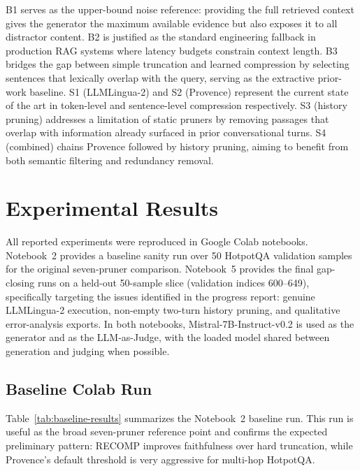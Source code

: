 \documentclass[11pt,a4paper]{article}
\begin{document}
B1 serves as the upper-bound noise reference: providing the full retrieved context gives the generator the maximum available evidence but also exposes it to all distractor content. B2 is justified as the standard engineering fallback in production RAG systems where latency budgets constrain context length. B3 bridges the gap between simple truncation and learned compression by selecting sentences that lexically overlap with the query, serving as the extractive prior-work baseline. S1 (LLMLingua-2) and S2 (Provence) represent the current state of the art in token-level and sentence-level compression respectively. S3 (history pruning) addresses a limitation of static pruners by removing passages that overlap with information already surfaced in prior conversational turns. S4 (combined) chains Provence followed by history pruning, aiming to benefit from both semantic filtering and redundancy removal.


\section{Experimental Results}

All reported experiments were reproduced in Google Colab notebooks. Notebook~2 provides a baseline sanity run over 50 HotpotQA validation samples for the original seven-pruner comparison. Notebook~5 provides the final gap-closing runs on a held-out 50-sample slice (validation indices 600--649), specifically targeting the issues identified in the progress report: genuine LLMLingua-2 execution, non-empty two-turn history pruning, and qualitative error-analysis exports. In both notebooks, Mistral-7B-Instruct-v0.2 is used as the generator and as the LLM-as-Judge, with the loaded model shared between generation and judging when possible.

\subsection{Baseline Colab Run}

Table~\ref{tab:baseline-results} summarizes the Notebook~2 baseline run. This run is useful as the broad seven-pruner reference point and confirms the expected preliminary pattern: RECOMP improves faithfulness over hard truncation, while Provence's default threshold is very aggressive for multi-hop HotpotQA.
\end{document}
